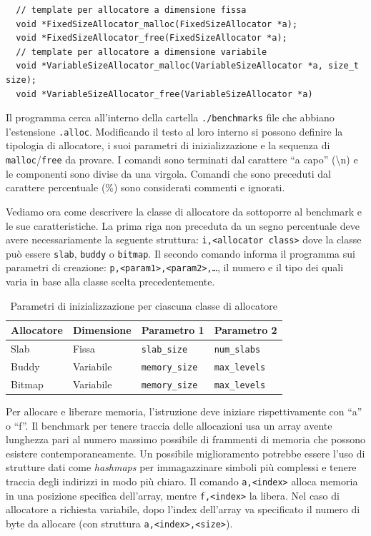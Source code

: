 \begin{lstlisting}
  // template per allocatore a dimensione fissa
  void *FixedSizeAllocator_malloc(FixedSizeAllocator *a);
  void *FixedSizeAllocator_free(FixedSizeAllocator *a);
  // template per allocatore a dimensione variabile
  void *VariableSizeAllocator_malloc(VariableSizeAllocator *a, size_t size);
  void *VariableSizeAllocator_free(VariableSizeAllocator *a)
\end{lstlisting}

Il programma cerca all’interno della cartella \texttt{./benchmarks} file che abbiano l’estensione \texttt{.alloc}. Modificando il testo al loro interno si possono definire la tipologia di allocatore, i suoi parametri di inizializzazione e la sequenza di \texttt{malloc}/\texttt{free} da provare. I comandi sono terminati dal carattere ``a capo'' (\textbackslash n) e le componenti sono divise da una virgola. Comandi che sono preceduti dal carattere percentuale (\%) sono considerati commenti e ignorati.

Vediamo ora come descrivere la classe di allocatore da sottoporre al benchmark e le sue caratteristiche. La prima riga non preceduta da un segno percentuale deve avere necessariamente la seguente struttura: \texttt{i,<allocator class>} dove la classe può essere \texttt{slab}, \texttt{buddy} o \texttt{bitmap}. Il secondo comando informa il programma sui parametri di creazione: \texttt{p,<param1>,<param2>,\ldots}, il numero e il tipo dei quali varia in base alla classe scelta precedentemente.

\begin{table}[H]
\centering
\begin{tabularx}{\textwidth}{|X|X|X|X|}
\hline
\textbf{Allocatore} & \textbf{Dimensione} & \textbf{Parametro 1} & \textbf{Parametro 2} \\
\hline
Slab    & Fissa     & \texttt{slab\_size}   & \texttt{num\_slabs}   \\
\hline
Buddy   & Variabile & \texttt{memory\_size} & \texttt{max\_levels}  \\
\hline
Bitmap  & Variabile & \texttt{memory\_size} & \texttt{max\_levels}  \\
\hline
\end{tabularx}
\caption{Parametri di inizializzazione per ciascuna classe di allocatore}
\end{table}

Per allocare e liberare memoria, l’istruzione deve iniziare rispettivamente con ``a'' o ``f''. Il benchmark per tenere traccia delle allocazioni usa un array avente lunghezza pari al numero massimo possibile di frammenti di memoria che possono esistere contemporaneamente. Un possibile miglioramento potrebbe essere l'uso di strutture dati come \textit{hashmaps} per immagazzinare simboli più complessi e tenere traccia degli indirizzi in modo più chiaro. Il comando \texttt{a,<index>} alloca memoria in una posizione specifica dell'array, mentre \texttt{f,<index>} la libera. Nel caso di allocatore a richiesta variabile, dopo l’index dell’array va specificato il numero di byte da allocare (con struttura \texttt{a,<index>,<size>}). 

